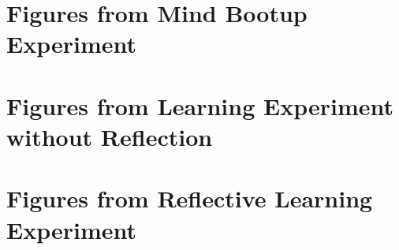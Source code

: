 \clearpage
\section{Figures from Mind Bootup Experiment}


\clearpage
\section{Figures from Learning Experiment without Reflection}


\clearpage
\section{Figures from Reflective Learning Experiment}


